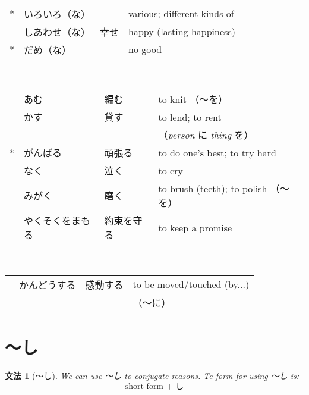 \documentclass[notoc,notitlepage]{tufte-book}
\newtheorem{grammar}{\faBook \enspace 文法}[section]
\begin{document}
 \\
\begin{tabular}{r l l l}
  *  & いろいろ（な） &      & various; different kinds of \\
     & しあわせ（な） & 幸せ & happy (lasting happiness) \\
  *  & だめ（な）     &      & no good
\end{tabular}

 \\
\begin{tabular}{r l l l}
      & あむ             & 編む       & to knit （〜を） \\
      & かす             & 貸す       & to lend; to rent \\
      &                  &            & （\textit{person} に \textit{thing} を） \\
  *   & がんばる         & 頑張る     & to do one's best; to try hard \\
      & なく             & 泣く       & to cry \\
      & みがく           & 磨く       & to brush (teeth); to polish （〜を） \\
      & やくそくをまもる & 約束を守る & to keep a promise
\end{tabular}

 \\
\begin{tabular}{r l l l}
      & かんどうする & 感動する & to be moved/touched (by...) \\
      &              &          & （〜に）
\end{tabular}

\section{〜し}

\begin{grammar}[〜し]
\label{grammar:_shi}
  We can use 〜し to conjugate reasons. Te form for using 〜し is:
  \begin{equation*}
    \text{ short form } + \text{ し }
  \end{equation*}
\end{grammar}
\end{document}
